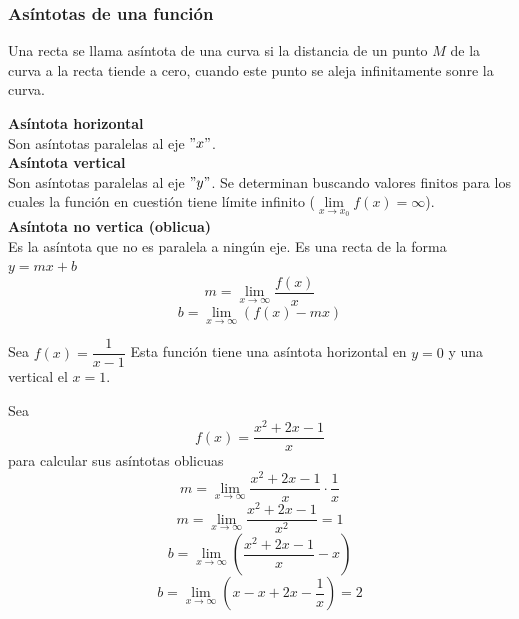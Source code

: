 \documentclass[10pt,twoside]{SelfArx} %
\begin{document}
\subsubsection{As\'intotas de una funci\'on}
\begin{thm}
	Una recta se llama \textsf{asíntota de una curva} si la distancia de un punto $ M $ de la curva a la recta tiende a cero, cuando este punto se aleja infinitamente sonre la curva.
\end{thm}

\textbf{Asíntota horizontal}\\
Son asíntotas paralelas al eje $ "x" $.\\


\textbf{Asíntota vertical}\\
Son asíntotas paralelas al eje $ "y" $. Se determinan buscando valores finitos para los cuales la función en cuestión tiene límite infinito ($ \lim\limits_{x\rightarrow x_{0}}f(x)=\infty $).\\

\textbf{Asíntota no vertica (oblicua)}\\
Es la asíntota que no es paralela a ningún eje. Es una recta de la forma $ y=mx+b $\\
\[ m=\lim\limits_{x\rightarrow\infty}\dfrac{f(x)}{x} \]
\[ b=\lim\limits_{x\rightarrow\infty}(f(x)-mx) \]

\begin{ejemplo}
	Sea $ f(x)=\dfrac{1}{x-1} $
	Esta función tiene una asíntota horizontal en $ y=0 $ y una vertical el $ x=1 $.
\end{ejemplo}

\begin{ejemplo}
	Sea
	\[ f(x)=\dfrac{x^{2}+2x-1}{x} \]
	para calcular sus as\'intotas oblicuas
	\begin{equation}
	m=\lim\limits_{x\rightarrow\infty}\dfrac{x^{2}+2x-1}{x}\cdot\dfrac{1}{x}
	\end{equation}
	\begin{equation}
		m=\lim\limits_{x\rightarrow\infty}\dfrac{x^{2}+2x-1}{x^{2}}=1
	\end{equation}
	\begin{equation}
		b=\lim\limits_{x\rightarrow\infty}\left (\dfrac{x^{2}+2x-1}{x}-x\right )
	\end{equation}
	\begin{equation}
	b=\lim\limits_{x\rightarrow\infty}(x-x+2x-\dfrac{1}{x})=2
	\end{equation}
\end{ejemplo}
\end{document}
